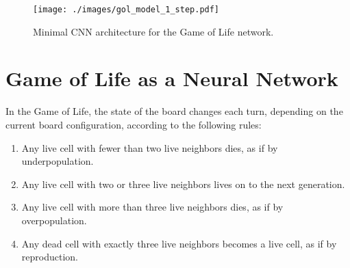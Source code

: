 \documentclass[letterpaper]{article} %
\begin{document}
\begin{figure*}[t]
    \centering
    \texttt{[image: ./images/gol\_model\_1\_step.pdf]}
    \caption{Minimal CNN architecture for the Game of Life network.}
    \label{fig:gol_model_1_step}
\end{figure*}



\section{Game of Life as a Neural Network}
In the Game of Life, the state of the board changes each turn, depending on the current board configuration, according to the following rules:
\begin{enumerate}
    \item Any live cell with fewer than two live neighbors dies, as if by underpopulation.
    \item Any live cell with two or three live neighbors lives on to the next generation.
    \item Any live cell with more than three live neighbors dies, as if by overpopulation.
    \item Any dead cell with exactly three live neighbors becomes a live cell, as if by reproduction.
\end{enumerate}
\end{document}
